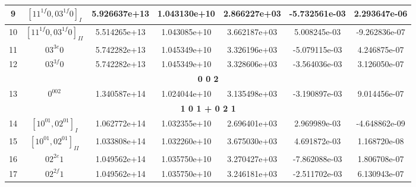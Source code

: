 \begin{table}[h!]
\begin{tabular}{|c|c|c|c|c|c|c|}
9 & $[11^{1f}0, 03^{1f}0]_{I}$ & 5.926637e+13 & 1.043130e+10 & 2.866227e+03 & -5.732561e-03 & 2.293647e-06 \\ \hline
10 & $[11^{1f}0, 03^{1f}0]_{II}$ & 5.514265e+13 & 1.043085e+10 & 3.662187e+03 & 5.008245e-03 & -9.262836e-07 \\ \hline
11 & $03^{3e}0$ & 5.742282e+13 & 1.045349e+10 & 3.326196e+03 & -5.079115e-03 & 4.246875e-07 \\ \hline
12 & $03^{3f}0$ & 5.742282e+13 & 1.045349e+10 & 3.328606e+03 & -3.564036e-03 & 3.126050e-07 \\ \hline
\multicolumn{7}{|c|}{\textbf{0 0 2}} \\ \hline
13 & $0^002$ & 1.340587e+14 & 1.024044e+10 & 3.135498e+03 & -3.190897e-03 & 9.014456e-07 \\ \hline
\multicolumn{7}{|c|}{\textbf{1 0 1 + 0 2 1}} \\ \hline
14 & $[10^01, 02^01]_{I}$ & 1.062772e+14 & 1.032355e+10 & 2.696401e+03 & 2.969989e-03 & -4.648862e-09 \\ \hline
15 & $[10^01, 02^01]_{II}$ & 1.033808e+14 & 1.032260e+10 & 3.675030e+03 & 4.691872e-03 & 1.168720e-08 \\ \hline
16 & $02^{2e}1$ & 1.049562e+14 & 1.035750e+10 & 3.270427e+03 & -7.862088e-03 & 1.806708e-07 \\ \hline
17 & $02^{2f}1$ & 1.049562e+14 & 1.035750e+10 & 3.246181e+03 & -2.511702e-03 & 6.130943e-07 \\ \hline
\end{tabular}
\end{table}


